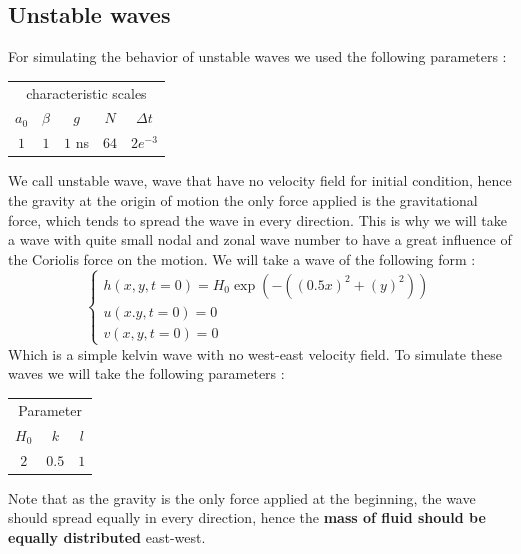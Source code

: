 \documentclass[11pt,a4paper]{report}
\begin{document}
\begin{multicols}{2}
    \subsection{Unstable waves}
    For simulating the behavior of unstable waves we used the following parameters :
    \begin{center}
        \begin{tabular}{ccccc}
            \toprule
            \multicolumn{5}{c}{characteristic scales}    \\
            \cmidrule{1 -5}
            $a_0$ & $\beta$ & $g$    & $N$  & $\Delta t$ \\
            \midrule
            $1$   & $1$     & $1$ ns & $64$ & $2e^{-3}$  \\
            \bottomrule
        \end{tabular}
    \end{center}
    We call unstable wave, wave that have no velocity field for initial condition, hence the gravity at the origin of motion the only force applied is the gravitational force, which tends to spread the wave in every direction. This is why we will take a wave with quite small nodal and zonal wave number to have a great influence of the Coriolis force on the motion.
    We will take a wave of the following form :
    \begin{equation}
        \label{eq:sharp wave}
        \begin{cases}
            h(x,y,t = 0) = H_0  \exp(- ((0.5x) ^2 +(y)^ 2)) \\
            u(x.y, t = 0) = 0                               \\
            v(x,y,t=0) = 0
        \end{cases}
    \end{equation}
    Which is a simple kelvin wave with no west-east velocity field. To simulate these waves we will take the following parameters :
    \begin{center}
        \begin{tabular}{c c c}
            \toprule
            \multicolumn{3}{c}{Parameter} \\
            \cmidrule{1 -3}
            $H_0$ & $k$   & $l$           \\
            \midrule
            $2$   & $0.5$ & $1$           \\
            \bottomrule
        \end{tabular}
    \end{center}
    Note that as the gravity is the only force applied at the beginning, the wave should spread equally in every direction, hence the \textbf{mass of fluid should be equally distributed} east-west.

\end{multicols}
\end{document}

